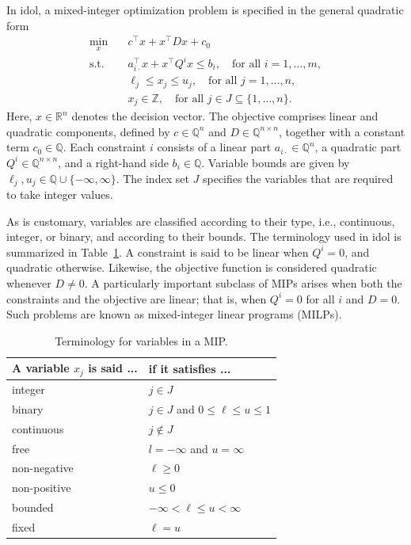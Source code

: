 In \textsf{idol}, a mixed-integer optimization problem is specified in the
general quadratic form
\begin{subequations}
    \begin{align}
        \min_x \quad & c^\top x + x^\top D x + c_0 \\
        \text{s.t.} \quad 
        & a_{i\cdot}^\top x + x^\top Q^i x \le b_i, \quad \text{for all } i=1,\dotsc,m, \\
        & \ell_j \le x_j \le u_j, \quad \text{for all } j = 1,\dotsc,n, \\
        & x_j\in \mathbb{Z}, \quad \text{for all } j\in J \subseteq\{1,\dotsc,n\}. \label{eq:mip:integer-requirements}
    \end{align}
    \label{eq:mip}
\end{subequations}%
Here, $x \in \mathbb{R}^n$ denotes the decision vector. The objective
comprises linear and quadratic components, defined by $c \in \mathbb{Q}^n$ and
$D \in \mathbb{Q}^{n\times n}$, together with a constant term $c_0 \in
\mathbb{Q}$. Each constraint $i$ consists of a linear part $a_{i\cdot} \in
\mathbb{Q}^n$, a quadratic part $Q^i \in \mathbb{Q}^{n\times n}$, and a
right-hand side $b_i \in \mathbb{Q}$. Variable bounds are given by $\ell_j,
u_j \in \mathbb{Q} \cup \{-\infty, \infty\}$. The index set $J$ specifies the
variables that are required to take integer values.

As is customary, variables are classified according to their type, i.e.,
continuous, integer, or binary, and according to their bounds. The terminology
used in \textsf{idol} is summarized in Table~\ref{tab:var-types}. A constraint
is said to be {linear} when $Q^i = 0$, and {quadratic} otherwise. Likewise,
the objective function is considered quadratic whenever $D \neq 0$. A
particularly important subclass of MIPs arises when both the constraints and
the objective are linear; that is, when $Q^i = 0$ for all $i$ and $D = 0$.
Such problems are known as mixed-integer linear programs (MILPs).

\begin{table}
    \caption{Terminology for variables in a MIP.}
    \label{tab:var-types}
    \begin{tabular}{ll}
        \toprule
        A variable $x_j$ is said ... & if it satisfies ... \\\midrule
        integer & $j\in J$ \\
        binary & $j\in J$ and $0 \le \ell \le u \le 1$ \\
        continuous & $j\notin J$ \\\midrule
        free & $l=-\infty$ and $u = \infty$ \\
        non-negative & $\ell \ge 0$ \\
        non-positive & $u \le 0$ \\
        bounded &  $-\infty < \ell \le u < \infty$ \\
        fixed &  $\ell = u$ \\\bottomrule
    \end{tabular}
\end{table}

